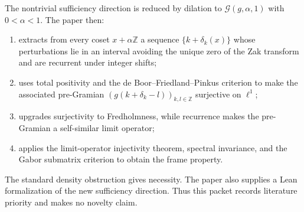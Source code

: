 \documentclass[11pt]{article}
\newcommand{\Z}{\mathbb Z}
\begin{document}
The nontrivial sufficiency direction is reduced by dilation to
$\mathcal G(g,\alpha,1)$ with $0<\alpha<1$.  The paper then:
\begin{enumerate}
\item extracts from every coset $x+\alpha\Z$ a sequence
  $\{k+\delta_k(x)\}$ whose perturbations lie in an interval avoiding the
  unique zero of the Zak transform and are recurrent under integer shifts;
\item uses total positivity and the de Boor--Friedland--Pinkus criterion to
  make the associated pre-Gramian
  $(g(k+\delta_k-l))_{k,l\in\Z}$ surjective on $\ell^1$;
\item upgrades surjectivity to Fredholmness, while recurrence makes the
  pre-Gramian a self-similar limit operator;
\item applies the limit-operator injectivity theorem, spectral invariance,
  and the Gabor submatrix criterion to obtain the frame property.
\end{enumerate}
The standard density obstruction gives necessity.  The paper also supplies
a Lean formalization of the new sufficiency direction.  Thus this packet
records literature priority and makes no novelty claim.
\end{document}
